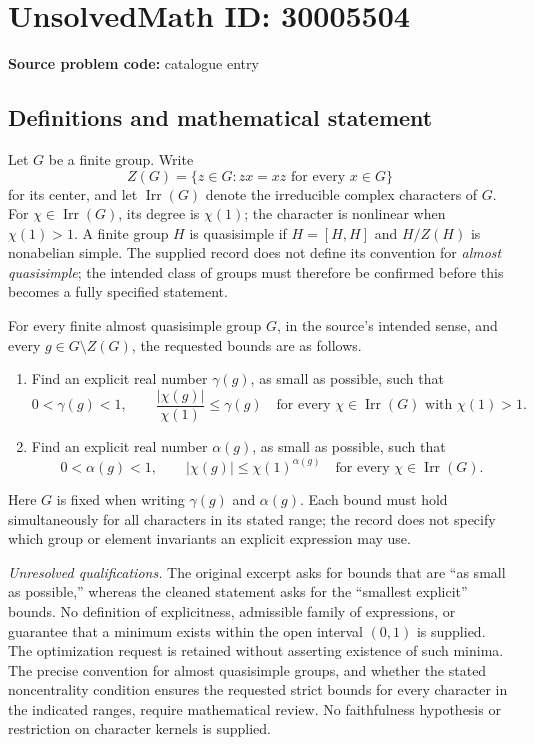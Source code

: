 \documentclass[11pt]{article}
\begin{document}
\section*{UnsolvedMath ID: 30005504}
\textbf{Source problem code:} catalogue entry
\subsection{Definitions and mathematical statement}
Let \(G\) be a finite group. Write
\[
Z(G)=\{z\in G:zx=xz\text{ for every }x\in G\}
\]
for its center, and let \(\operatorname{Irr}(G)\) denote the irreducible complex characters of \(G\). For \(\chi\in\operatorname{Irr}(G)\), its degree is \(\chi(1)\); the character is nonlinear when \(\chi(1)>1\). A finite group \(H\) is quasisimple if \(H=[H,H]\) and \(H/Z(H)\) is nonabelian simple. The supplied record does not define its convention for \emph{almost quasisimple}; the intended class of groups must therefore be confirmed before this becomes a fully specified statement.

For every finite almost quasisimple group \(G\), in the source's intended sense, and every \(g\in G\setminus Z(G)\), the requested bounds are as follows.
\begin{enumerate}
\item[(A)] Find an explicit real number \(\gamma(g)\), as small as possible, such that
\[
0<\gamma(g)<1,
\qquad
\frac{|\chi(g)|}{\chi(1)}\leq\gamma(g)
\quad\text{for every }\chi\in\operatorname{Irr}(G)
\text{ with }\chi(1)>1.
\]
\item[(B)] Find an explicit real number \(\alpha(g)\), as small as possible, such that
\[
0<\alpha(g)<1,
\qquad
|\chi(g)|\leq\chi(1)^{\alpha(g)}
\quad\text{for every }\chi\in\operatorname{Irr}(G).
\]
\end{enumerate}
Here \(G\) is fixed when writing \(\gamma(g)\) and \(\alpha(g)\). Each bound must hold simultaneously for all characters in its stated range; the record does not specify which group or element invariants an explicit expression may use.

\emph{Unresolved qualifications.} The original excerpt asks for bounds that are ``as small as possible,'' whereas the cleaned statement asks for the ``smallest explicit'' bounds. No definition of explicitness, admissible family of expressions, or guarantee that a minimum exists within the open interval \((0,1)\) is supplied. The optimization request is retained without asserting existence of such minima. The precise convention for almost quasisimple groups, and whether the stated noncentrality condition ensures the requested strict bounds for every character in the indicated ranges, require mathematical review. No faithfulness hypothesis or restriction on character kernels is supplied.
\end{document}
